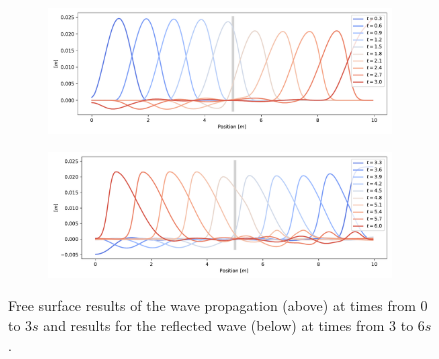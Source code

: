 \documentclass[a4paper,12pt]{article}
\begin{document}
\begin{figure}[H]
\begin{subfigure}{\textwidth}
    \includegraphics[width=\textwidth]{img/step/free_surface_1.pdf}
\end{subfigure}
\begin{subfigure}{\textwidth}
    \includegraphics[width=\textwidth]{img/step/free_surface_2.pdf}
\end{subfigure}
\caption{Free surface results of the wave propagation (above) at times from $0$ to $3s$ and results for the reflected wave (below) at times from $3$ to $6s$.}
\label{waves_propagation}
\end{figure}
\end{document}
